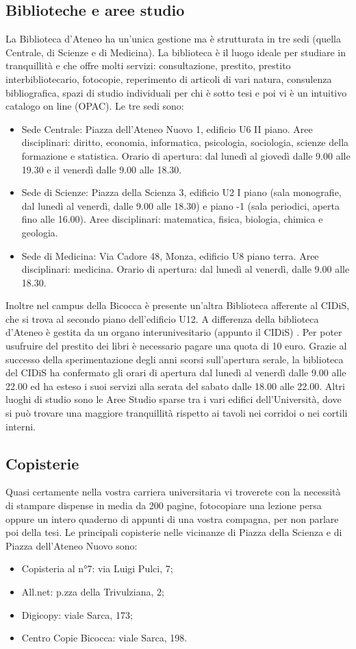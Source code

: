 \subsection{Biblioteche e aree studio}
La Biblioteca d'Ateneo ha un'unica gestione ma è strutturata in tre sedi (quella Centrale, di Scienze e di Medicina). La biblioteca è il luogo ideale per studiare in tranquillità e che offre molti servizi: consultazione, prestito, prestito interbibliotecario, fotocopie, reperimento di articoli di vari natura, consulenza bibliografica, spazi di studio individuali per chi è sotto tesi e poi vi è un intuitivo catalogo on line (OPAC).
Le tre sedi sono:
\begin{itemize}
\item Sede Centrale: Piazza dell'Ateneo Nuovo 1, edificio U6 II piano. Aree disciplinari: diritto, economia, informatica, psicologia, sociologia, scienze della formazione e statistica. Orario di apertura: dal lunedì al giovedì dalle 9.00 alle 19.30 e il venerdì dalle 9.00 alle 18.30.
\item Sede di Scienze: Piazza della Scienza 3, edificio U2 I piano (sala monografie, dal lunedì al venerdì, dalle 9.00 alle 18.30) e piano -1 (sala periodici, aperta fino alle 16.00). Aree disciplinari: matematica, fisica, biologia, chimica e geologia.
\item Sede di Medicina: Via Cadore 48, Monza, edificio U8 piano terra. Aree disciplinari: medicina. Orario di apertura: dal lunedì al venerdì, dalle 9.00 alle 18.30.
\end{itemize}
Inoltre nel campus della Bicocca è presente un'altra Biblioteca afferente al CIDiS, che si trova al secondo piano dell'edificio U12. A differenza della biblioteca d'Ateneo è gestita da un organo interunivesitario (appunto il CIDiS) . Per poter usufruire del prestito dei libri è necessario pagare una quota di 10 euro. Grazie al successo della sperimentazione degli anni scorsi sull'apertura serale, la biblioteca del CIDiS ha confermato gli orari di apertura dal lunedì al venerdì dalle 9.00 alle 22.00 ed ha esteso i suoi servizi alla serata del sabato dalle 18.00 alle 22.00.
Altri luoghi di studio sono le Aree Studio sparse tra i vari edifici dell'Università, dove si può trovare una maggiore tranquillità rispetto ai tavoli nei corridoi o nei cortili interni.

\subsection{Copisterie}
Quasi certamente nella vostra carriera universitaria vi troverete con la necessità di stampare dispense in media da 200 pagine, fotocopiare una lezione persa oppure un intero quaderno di appunti di una vostra compagna, per non parlare poi della tesi. Le principali copisterie nelle vicinanze di Piazza della Scienza e di Piazza dell'Ateneo Nuovo sono:
\begin{itemize}
\item Copisteria al n°7: via Luigi Pulci, 7;
\item All.net: p.zza della Trivulziana, 2;
\item Digicopy: viale Sarca, 173;
\item Centro Copie Bicocca: viale Sarca, 198.
\end{itemize}
